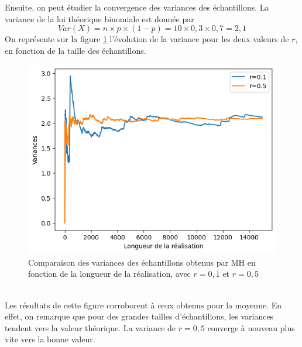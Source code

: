 \documentclass[a4paper, 11pt]{article}
\begin{document}
Ensuite, on peut étudier la convergence des variances des échantillons. La variance de la loi théorique binomiale est donnée par
\begin{equation}
    Var(X)=n\times p \times  (1-p)=10\times 0,3 \times 0,7=2,1
\end{equation}
On représente sur la figure \ref{var} l'évolution de la variance pour les deux valeurs de $r$,  en fonction de la taille des échantillons. 

\begin{figure}[h!]
    \centering
    \includegraphics[scale=1]{var.png}
    \caption{Comparaison des variances des échantillons obtenus par MH en fonction de la longueur de la réalisation, avec $r=0,1$ et $r=0,5$}
    \label{var}
\end{figure}\\

Les résultats de cette figure corroborent à ceux obtenus pour la moyenne. En effet, on remarque que pour des grandes tailles d'échantillons, les variances tendent vers la valeur théorique. La variance de $r=0,5$ converge à nouveau plus vite vers la bonne valeur.
\newpage
\end{document}
